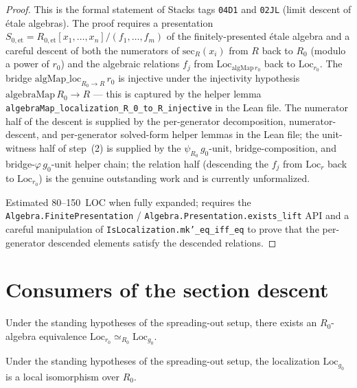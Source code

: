 \begin{proof}
  This is the formal statement of Stacks tags \texttt{04D1} and \texttt{02JL}
  (limit descent of \'etale algebras). The proof requires a presentation
  $S_{0,\mathrm{et}} = R_{0,\mathrm{et}}[x_1,\dots,x_n]/(f_1,\dots,f_m)$
  of the finitely-presented \'etale algebra and a careful descent of both the
  numerators of $\mathrm{sec}_R(x_i)$ from $R$ back to $R_0$ (modulo a power
  of $r_0$) and the algebraic relations $f_j$ from
  $\mathrm{Loc}_{\mathrm{algMap}\, r_0}$ back to $\mathrm{Loc}_{r_0}$. The
  bridge $\mathrm{algMap\_loc}_{R_0 \to R}\, r_0$ is injective under the
  injectivity hypothesis $\mathrm{algebraMap}\,R_0 \to R$ — this is captured
  by the helper lemma \texttt{algebraMap\_localization\_R\_0\_to\_R\_injective}
  in the Lean file. The numerator half of the descent is supplied by the
  per-generator decomposition, numerator-descent, and per-generator
  solved-form helper lemmas in the Lean file; the unit-witness half of
  step~(2) is supplied by the $\psi_{R_0}\,g_0$-unit, bridge-composition,
  and bridge-$\varphi\,g_0$-unit helper chain; the relation half (descending
  the $f_j$ from $\mathrm{Loc}_{r}$ back to $\mathrm{Loc}_{r_0}$) is the
  genuine outstanding work and is currently unformalized.

  Estimated 80--150~LOC when fully expanded; requires the
  \texttt{Algebra.FinitePresentation} / \texttt{Algebra.Presentation.exists\_lift}
  API and a careful manipulation of \texttt{IsLocalization.mk'\_eq\_iff\_eq}
  to prove that the per-generator descended elements satisfy the descended
  relations.
\end{proof}

\section{Consumers of the section descent}

\begin{lemma}
  \label{lem:descent-etale-section-after-localization}
  Under the standing hypotheses of the spreading-out setup, there exists an
  $R_0$-algebra equivalence
  $\mathrm{Loc}_{r_0} \simeq_{R_0} \mathrm{Loc}_{g_0}$.
\end{lemma}

\begin{lemma}
  \label{lem:descent-one-isLocalIso-template}
  Under the standing hypotheses of the spreading-out setup, the localization
  $\mathrm{Loc}_{g_0}$ is a local isomorphism over $R_0$.
\end{lemma}

